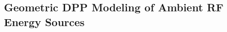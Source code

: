 \documentclass[12pt,draftclsnofoot,onecolumn]{IEEEtran}
\begin{document}
\begin{comment}
The main notations used in this paper are summarized in Table~\ref{notation}.


\begin{table}
\centering
\caption{\footnotesize NOTATIONS.} \label{notation}
\begin{tabular}{|l|l|} 
\hline
Symbol & Definition\\ \hline
\hline
 $\tau$ & Portion of time a receiver working on energy harvesting mode   \\
$P_H$  & Aggregated RF energy harvesting rate at the sensor    \\
$P_C$  & Constant circuit power consumption of the sensor \\
 $\beta$   &  RF-to-DC power conversion efficiency of a sensor  \\
 $P_{S}$  &   Transmit power of RF energy source $k \in \mathcal{K}$   \\
 $G_{\mathrm{S}}$ & Transmit antenna gain of RF energy source $k \in \mathcal{K}$   \\
 $G_{\mathrm{H}}$ &  Receive antenna gain of a sensor \\
 $\lambda_{k}$  & Wavelength emitted at RF energy source $k \in \mathcal{K}$.  \\
 $d_{k}$ &  Distance between the transmit antenna of RF energy source $k$  the receiver antenna of a sensor   \\
 ${\mathbf{x}}_i$ &  Coordinates of a sensor  \\
 ${\mathbf{x}}_k$ &  Coordinates of the RF energy source $k$  \\    
 $h_{0}$ & Channel gain between the sensor and data sink \\
 $\sigma^{2}$  & Power of AWGN \\
 $\sigma_{SP}^{2}$ & Power of signal processing noise \\
 $W$ & Transmission bandwidth \\
  $m$ & Minimum transmission rate requirement \\                    
\hline                                            
\end{tabular}
\end{table}
\end{comment}


\subsection{Geometric DPP Modeling of Ambient RF Energy Sources}
\label{sec:geometricmodeling}
\end{document}
